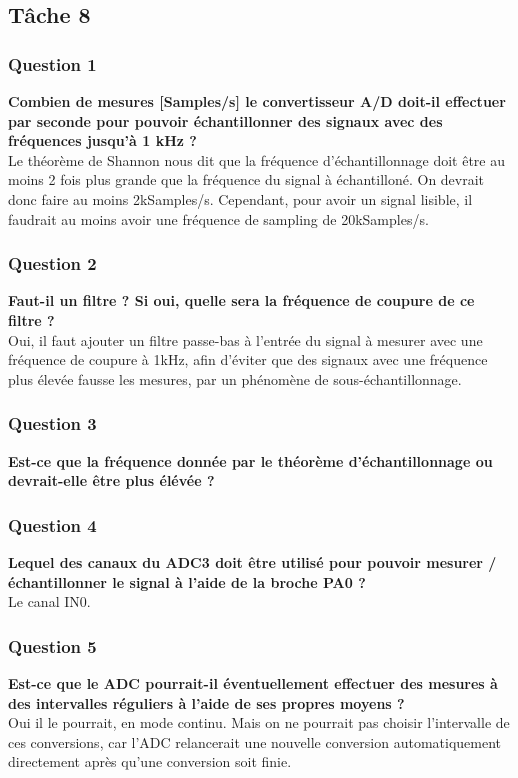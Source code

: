 \documentclass[12pt]{article}
\begin{document}
	\subsection{Tâche 8}
	\subsubsection{Question 1}
	\textbf{Combien de mesures [Samples/s] le convertisseur A/D doit-il effectuer par seconde pour pouvoir échantillonner des signaux avec des fréquences jusqu'à 1 kHz ?}\\
	Le théorème de Shannon nous dit que la fréquence d'échantillonnage doit être au moins 2 fois plus grande que la fréquence du signal à échantilloné. On devrait donc faire au moins 2kSamples/s. Cependant, pour avoir un signal lisible, il faudrait au moins avoir une fréquence de sampling de 20kSamples/s.
	\subsubsection{Question 2}
	\textbf{Faut-il un filtre ? Si oui, quelle sera la fréquence de coupure de ce filtre ?}\\
	Oui, il faut ajouter un filtre passe-bas à l'entrée du signal à mesurer avec une fréquence de coupure à 1kHz, afin d'éviter que des signaux avec une fréquence plus élevée fausse les mesures, par un phénomène de sous-échantillonnage.
	\subsubsection{Question 3}
	\textbf{Est-ce que la fréquence donnée par le théorème d’échantillonnage ou devrait-elle être plus élévée ?}\\	
	\subsubsection{Question 4}
	\textbf{Lequel des canaux du ADC3 doit être utilisé pour pouvoir mesurer / échantillonner le signal à l'aide de la broche PA0 ?}\\
	Le canal IN0.
	\subsubsection{Question 5}
	\textbf{Est-ce que le ADC pourrait-il éventuellement effectuer des mesures à des intervalles réguliers à l'aide de ses propres moyens ?}\\	
	Oui il le pourrait, en mode continu. Mais on ne pourrait pas choisir l'intervalle de ces conversions, car l'ADC relancerait une nouvelle conversion automatiquement directement après qu'une conversion soit finie.
\end{document}
